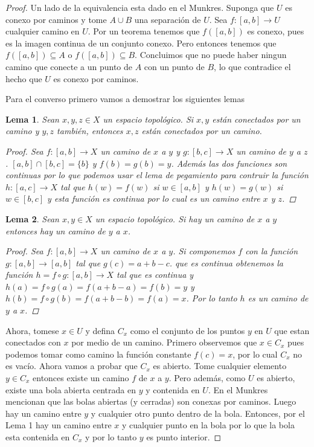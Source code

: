 \documentclass[letter,twoside,12pt]{article}
\newtheorem{lemma}{Lema}
\begin{document}
\begin{enumerate}
\begin{proof}
Un lado de la equivalencia esta dado en el Munkres. Suponga que $ U $ es conexo por caminos y tome $ A \cup B $ una separación de $U$. Sea $ f:[a,b] \to U $ cualquier camino en $U$. Por un teorema tenemos que $ f([a,b]) $ es conexo, pues es la imagen continua de un conjunto conexo. Pero entonces tenemos que $ f([a,b]) \subseteq A $ o $ f([a,b]) \subseteq B $. Concluimos que no puede haber ningun camino que conecte a un punto de $A$ con un punto de $B$, lo que contradice el hecho que $ U $ es conexo por caminos.

Para el converso primero vamos a demostrar los siguientes lemas
\begin{lemma}
Sean $x,y,z \in X$ un espacio topológico. Si $x,y$ están conectados por un camino y $ y,z $ también, entonces $ x,z $ están conectados por un camino.
\begin{proof}
Sea $f:[a,b]\to X$ un camino de $x$ a $y$ y $g:[b,c]\to X$ un camino de $y$ a $z$. $[a,b] \cap [b,c]=\{b\}$ y $ f(b)=g(b)=y $. Además las dos funciones son continuas por lo que podemos usar el lema de pegamiento para contruir la función $ h:[a,c]\to X $ tal que $h(w)=f(w)$ si $ w \in [a,b] $ y $h(w)=g(w)$ si $ w \in [b,c] $ y esta función es continua por lo cual es un camino entre $x$ y $z$. 
\end{proof}
\end{lemma}

\begin{lemma}
Sean $x,y \in X$ un espacio topológico. Si hay un camino de $x$ a $y$ entonces hay un camino de $y $ a $ x $.
\begin{proof}
Sea $f:[a,b]\to X$ un camino de $x$ a $y$. Si componemos $f$ con la función $g:[a,b] \to [a,b]$ tal que $g(c)=a+b-c$. que es continua obtenemos la función $h = f \circ g : [a,b] \to X$ tal que es continua y $h(a)= f \circ g(a)=f(a+b-a)=f(b)=y$ y $h(b)= f \circ g(b)=f(a+b-b)=f(a)=x$. Por lo tanto $h$ es un camino de $y$ a $x$. 
\end{proof}
\end{lemma}

Ahora, tomese $x \in U$ y defina $C_x$ como el conjunto de los puntos $ y $ en $U$ que estan conectados con $x$ por medio de un camino. Primero observemos que $ x \in C_x $ pues podemos tomar como camino la función constante $f(c)=x$, por lo cual $ C_x $ no es vacío. Ahora vamos a probar que $C_x$ es abierto. Tome cualquier elemento $y \in C_x$ entonces existe un camino $f$ de $x$ a $y$. Pero además, como $U$ es abierto, existe una bola abierta centrada en $y$ y contenida en $U$. En el Munkres mencionan que las bolas abiertas (y cerradas) son conexas por caminos. Luego hay un camino entre $y$ y cualquier otro punto dentro de la bola. Entonces, por el Lema 1 hay un camino entre $x$ y cualquier punto en la bola por lo que la bola esta contenida en $ C_x $ y por lo tanto $y$ es punto interior.


\end{proof}
\end{enumerate}
\end{document}
